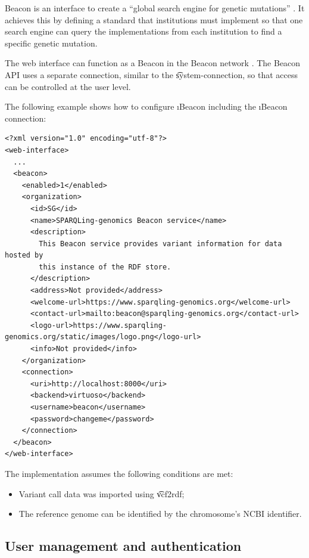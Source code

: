   Beacon is an interface to create a ``global search engine for genetic
  mutations'' \citep{beacon-network}.  It achieves this by defining a
  standard that institutions must implement so that one search engine can
  query the implementations from each institution to find a specific
  genetic mutation.

  The web interface can function as a Beacon in the Beacon network
  \citep{beacon-network}.  The Beacon API uses a separate connection,
  similar to the \t{system-connection}, so that access can be
  controlled at the user level.

  The following example shows how to configure \i{Beacon} including the
  \i{Beacon connection}:

\begin{siderules}
\begin{verbatim}
<?xml version="1.0" encoding="utf-8"?>
<web-interface>
  ...
  <beacon>
    <enabled>1</enabled>
    <organization>
      <id>SG</id>
      <name>SPARQLing-genomics Beacon service</name>
      <description>
        This Beacon service provides variant information for data hosted by
        this instance of the RDF store.
      </description>
      <address>Not provided</address>
      <welcome-url>https://www.sparqling-genomics.org</welcome-url>
      <contact-url>mailto:beacon@sparqling-genomics.org</contact-url>
      <logo-url>https://www.sparqling-genomics.org/static/images/logo.png</logo-url>
      <info>Not provided</info>
    </organization>
    <connection>
      <uri>http://localhost:8000</uri>
      <backend>virtuoso</backend>
      <username>beacon</username>
      <password>changeme</password>
    </connection>
  </beacon>
</web-interface>
\end{verbatim}
\end{siderules}

  The implementation assumes the following conditions are met:
  \begin{itemize}
  \item Variant call data was imported using \t{vcf2rdf};
  \item The reference genome can be identified by the chromosome's NCBI
    identifier.
  \end{itemize}

\subsection{User management and authentication}
\label{sec:authentication}

